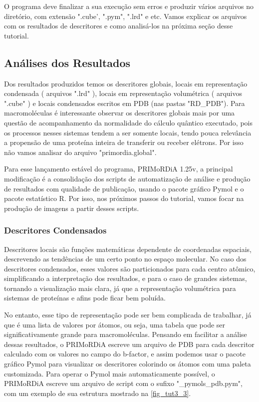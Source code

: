 \documentclass[a4paper,11pt]{refart}
\begin{document}
O programa deve finalizar a sua execução sem erros e produzir vários arquivos no diretório, com extensão ".cube', ".pym", ".lrd" e etc. Vamos explicar os arquivos com os resultados de descritores e como analisá-los na próxima seção desse tutorial.

\subsection{Análises dos Resultados}

Dos resultados produzidos temos os descritores globais, locais em representação condensada ( arquivos ".lrd" ), locais em representação volumétrica ( arquivos ".cube" ) e locais condensados escritos em PDB (nas pastas "RD\_PDB"). Para macromoléculas é interessante observar os descritores globais mais por uma questão de acompanhamento da normalidade do cálculo quântico executado, pois os processos nesses sistemas tendem a ser somente locais, tendo pouca relevância a propensão de uma proteína inteira de transferir ou receber elétrons. Por isso não vamos analisar do arquivo "primordia.global".

Para esse lançamento estável do programa, PRIMoRDiA 1.25v, a principal modificação é a consolidação dos scripts de automatização de análise e produção de resultados com qualidade de publicação, usando o pacote gráfico Pymol e o pacote estatístico R. Por isso, nos próximos passos do tutorial, vamos focar na produção de imagens a partir desses scripts.

\subsubsection{Descritores Condensados} 

Descritores locais são funções matemáticas dependente de coordenadas espaciais, descrevendo as tendências de um certo ponto no espaço molecular. No caso dos descritores condensados, esses valores são particionados para cada centro atômico, simplificando a interpretação dos resultados, e para o caso de grandes sistemas, tornando a visualização mais clara, já que a representação volumétrica para sistemas de proteínas e afins pode ficar bem poluída.

No entanto, esse tipo de representação pode ser bem complicada de trabalhar, já que é uma lista de valores por átomos, ou seja, uma tabela que pode ser significativamente grande para macromoléculas. Pensando em facilitar a análise dessas resultados, o PRIMoRDiA escreve um arquivo de PDB para cada descritor calculado com os valores no campo do b-factor, e assim podemos usar o pacote gráfico Pymol para visualizar os descritores colorindo os átomos com uma paleta customizada. Para operar o Pymol mais automaticamente possível, o PRIMoRDiA escreve um arquivo de script com o sufixo "\_pymols\_pdb.pym", com um exemplo de sua estrutura mostrado na \autoref{fig_tut3_3}.
\end{document}
